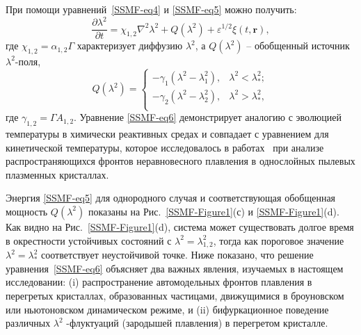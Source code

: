При помощи уравнений~\eqref{SSMF-eq4} и \eqref{SSMF-eq5} можно получить:
\begin{equation}
\label{SSMF-eq6}
\frac{\partial \lambda^2}{\partial t} = \chi_{1,2} \nabla^2\lambda^2 + Q(\lambda^2) +  \varepsilon^{1/2}\xi(t,\mathbf{r}),
\end{equation}
где $ \chi_{1,2} = \alpha_{1,2} \Gamma$ характеризует диффузию $\lambda^2$,
а $ Q (\lambda ^ 2) $ -- обобщенный источник $ \lambda^2$-поля,
\begin{equation}
\label{SSMF-eq7}
Q(\lambda^2) =
\left\{
  \begin{array}{ll}
  -\gamma_{1}\left(\lambda^2-\lambda_{1}^2\right), & \lambda^2  < \lambda_\ast^2;\\
  -\gamma_{2}\left(\lambda^2-\lambda_{2}^2\right), & \lambda^2 > \lambda_\ast^2,\\
  \end{array}
\right.
\end{equation}
где $\gamma_{1,2} = \Gamma A_{1,2}$.
Уравнение \eqref{SSMF-eq6} демонстрирует аналогию с эволюцией температуры в химически реактивных средах \cite{10.1088/0004-637x/805/1/59} и совпадает с уравнением для кинетической температуры, которое исследовалось в работах~\cite{10.1103/physreve.96.043201, 10.1103/physreve.97.043206, 10.1103/physreve.100.023203} при анализе распространяющихся фронтов неравновесного плавления в однослойных пылевых плазменных кристаллах.

Энергия \eqref{SSMF-eq5} для однородного случая и соответствующая обобщенная мощность $ Q (\lambda ^ 2) $ показаны на Рис.~\ref{SSMF-Figure1}(с) и \ref{SSMF-Figure1}(d).
Как видно на Рис.~\ref{SSMF-Figure1}(d), система может существовать долгое время в окрестности устойчивых состояний с $\lambda^2= \lambda_{1,2} ^ 2 $, тогда как пороговое значение $\lambda^2=\lambda_\ast^2$ соответствует неустойчивой точке.
Ниже показано, что решение уравнения~\eqref{SSMF-eq6} объясняет два важных явления, изучаемых в настоящем исследовании:
(i) распространение автомодельных фронтов плавления в перегретых кристаллах, образованных частицами, движущимися в броуновском или ньютоновском динамическом режиме, и (ii) бифуркационное поведение различных $\lambda^2$ -флуктуаций (зародышей плавления) в перегретом кристалле.

